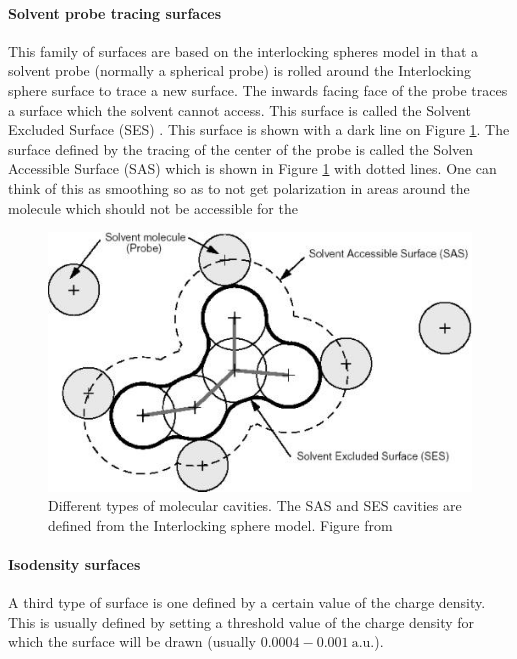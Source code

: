 \documentclass[../master_thesis.tex]{subfiles}
\begin{document}
\paragraph{Solvent probe tracing surfaces}\label{Spts}
This family of surfaces are based on the interlocking spheres model in that a
solvent probe (normally a spherical probe) is rolled around the Interlocking
sphere surface to trace a new surface. The inwards facing face of the probe traces a surface
which the solvent cannot access. This surface is called the Solvent Excluded
Surface (SES) \cite{Tomasi:2005ipa, Mennucci:2018}. This surface is shown with a
dark line on Figure \ref{fig:cavities}. The surface defined by the tracing of
the center of the probe is called the Solven Accessible Surface (SAS) which is
shown in Figure \ref{fig:cavities} with dotted lines. One can think of this as
smoothing so as to not get polarization in areas around the molecule which should
not be accessible for the

\begin{figure}[ht]
  \includegraphics[width=\linewidth]{img/molecularcavity.jpg}
  \caption{Different types of molecular cavities. The SAS and SES cavities are
  defined from the Interlocking sphere model. Figure from \cite{Tomasi:2005ipa}}
  \label{fig:cavities}
\end{figure}

\paragraph{Isodensity surfaces}
A third type of surface is one defined by a certain value of the charge density.
This is usually defined by setting a threshold value of the charge density for
which the surface will be drawn (usually $0.0004-0.001\ \text{a.u.}$)\cite{Tomasi:2005ipa}.
\end{document}
